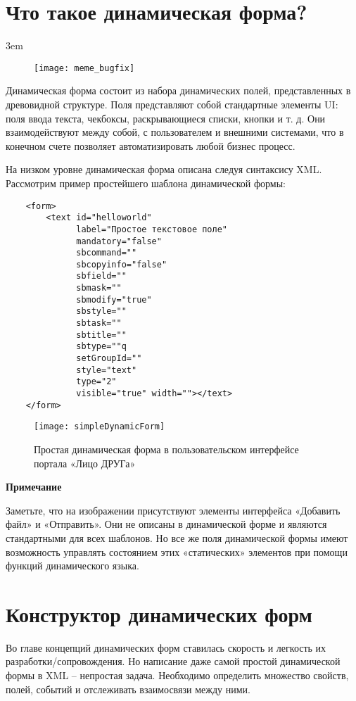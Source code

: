 \documentclass[../index.tex]{subfiles}
\begin{document}
\section{Что такое динамическая форма?}
\emergencystretch 3em

\begin{figure}[h]
	\texttt{[image: meme\_bugfix]}
	\centering
\end{figure}


Динамическая форма состоит из набора динамических полей, представленных в древовидной структуре.
Поля представляют собой стандартные элементы UI: поля ввода текста, чекбоксы, раскрывающиеся списки, кнопки и т. д.
Они взаимодействуют между собой, с пользователем и внешними системами,
что в конечном счете позволяет автоматизировать любой бизнес процесс.

На низком уровне динамическая форма описана следуя синтаксису XML.
Рассмотрим пример простейшего шаблона динамической формы:
\begin{verbatim}
    <form>
        <text id="helloworld"
              label="Простое текстовое поле"
              mandatory="false"
              sbcommand=""
              sbcopyinfo="false"
              sbfield=""
              sbmask=""
              sbmodify="true"
              sbstyle=""
              sbtask=""
              sbtitle=""
              sbtype=""q
              setGroupId=""
              style="text"
              type="2"
              visible="true" width=""></text>
    </form>
\end{verbatim}

\begin{figure}[h]
    \texttt{[image: simpleDynamicForm]}
    \centering
    \caption{Простая динамическая форма в пользовательском интерфейсе портала «Лицо ДРУГа»}
\end{figure}

\bigbreak
\textbf{Примечание}

Заметьте, что на изображении присутствуют элементы интерфейса «Добавить файл» и «Отправить».
Они не описаны в динамической форме и являются стандартными для всех шаблонов.
Но все же поля динамической формы имеют возможность управлять состоянием этих «статических» элементов
при помощи функций динамического языка.

\section{Конструктор динамических форм}
Во главе концепций динамических форм ставилась скорость и легкость их разработки/сопровождения.
Но написание даже самой простой динамической формы в XML – непростая задача.
Необходимо определить множество свойств, полей, событий и отслеживать взаимосвязи между ними.
\end{document}

